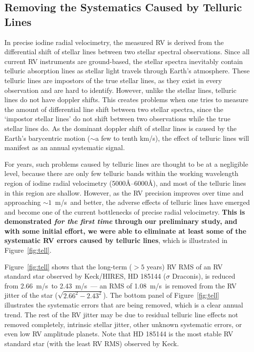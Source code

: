\documentclass[12pt]{article}
\def\mps{m/s}
\def\keck{Keck/HIRES}
\begin{document}
\subsection{Removing the Systematics Caused by Telluric
  Lines}\label{sec:tell}

In precise iodine radial velocimetry, the measured RV is derived from
the differential shift of stellar lines between two stellar spectral
observations. Since all current RV instruments are ground-based, the
stellar spectra inevitably contain telluric absorption lines as
stellar light travels through Earth's atmosphere. These telluric lines
are impostors of the true stellar lines, as they exist in every
observation and are hard to identify. However, unlike the stellar
lines, telluric lines do not have doppler shifts. This creates
problems when one tries to measure the amount of differential line
shift between two stellar spectra, since the `impostor stellar lines'
do not shift between two observations while the true stellar lines
do. As the dominant doppler shift of stellar lines is caused by the
Earth's barycentric motion ($\sim$a few to tenth k\mps), the effect of
telluric lines will manifest as an annual systematic signal.

For years, such problems caused by telluric lines are thought to be at
a negligible level, because there are only few telluric bands within
the working wavelength region of iodine radial velocimetry
(5000\AA--6000\AA), and most of the telluric lines in this region are
shallow. However, as the RV precision improves over time and
approaching $\sim1$~\mps\ and better, the adverse effects of telluric
lines have emerged and become one of the current bottlenecks of
precise radial velocimetry. \textbf{This is demonstrated \textit{for
    the first time} through our preliminary study, and with some
  initial effort, we were able to eliminate at least some of the
  systematic RV errors caused by telluric lines}, which is illustrated
in Figure~\ref{fig:tell}.

Figure~\ref{fig:tell} shows that the long-term ($> 5$ years) RV RMS of
an RV standard star observed by \keck, HD 185144 ($\sigma$ Draconis),
is reduced from 2.66~\mps\ to 2.43~\mps\ --- an RMS of 1.08~\mps\ is
removed from the RV jitter of the star ($\sqrt{2.66^2-2.43^2}$). The
bottom panel of Figure~\ref{fig:tell} illustrates the systematic
errors that are being removed, which is a clear annual trend. The rest
of the RV jitter may be due to residual telluric line effects not
removed completely, intrinsic stellar jitter, other unknown systematic
errors, or even low RV amplitude planets. Note that HD 185144 is the
most stable RV standard star (with the least RV RMS) observed by Keck.
\end{document}
